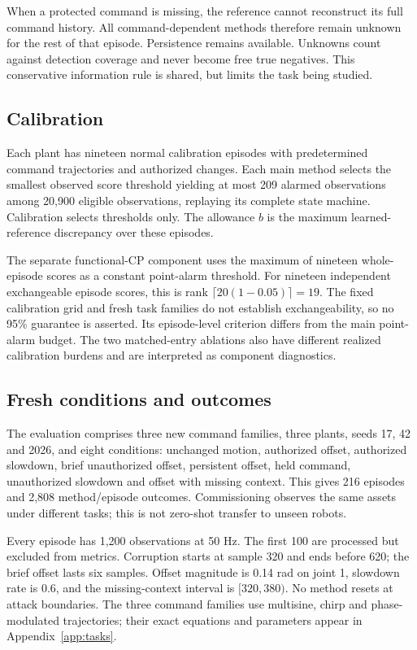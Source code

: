 \documentclass[11pt]{article}
\begin{document}
When a protected command is missing, the reference cannot reconstruct its full command history. All command-dependent methods therefore remain unknown for the rest of that episode. Persistence remains available. Unknowns count against detection coverage and never become free true negatives. This conservative information rule is shared, but limits the task being studied.

\subsection{Calibration}
Each plant has nineteen normal calibration episodes with predetermined command trajectories and authorized changes. Each main method selects the smallest observed score threshold yielding at most 209 alarmed observations among 20,900 eligible observations, replaying its complete state machine. Calibration selects thresholds only. The allowance $b$ is the maximum learned-reference discrepancy over these episodes.

The separate functional-CP component uses the maximum of nineteen whole-episode scores as a constant point-alarm threshold. For nineteen independent exchangeable episode scores, this is rank $\lceil20(1-0.05)\rceil=19$. The fixed calibration grid and fresh task families do not establish exchangeability, so no 95\% guarantee is asserted. Its episode-level criterion differs from the main point-alarm budget. The two matched-entry ablations also have different realized calibration burdens and are interpreted as component diagnostics.

\subsection{Fresh conditions and outcomes}
The evaluation comprises three new command families, three plants, seeds 17, 42 and 2026, and eight conditions: unchanged motion, authorized offset, authorized slowdown, brief unauthorized offset, persistent offset, held command, unauthorized slowdown and offset with missing context. This gives 216 episodes and 2,808 method/episode outcomes. Commissioning observes the same assets under different tasks; this is not zero-shot transfer to unseen robots.

Every episode has 1,200 observations at 50 Hz. The first 100 are processed but excluded from metrics. Corruption starts at sample 320 and ends before 620; the brief offset lasts six samples. Offset magnitude is 0.14 rad on joint 1, slowdown rate is 0.6, and the missing-context interval is $[320,380)$. No method resets at attack boundaries. The three command families use multisine, chirp and phase-modulated trajectories; their exact equations and parameters appear in Appendix~\ref{app:tasks}.
\end{document}
